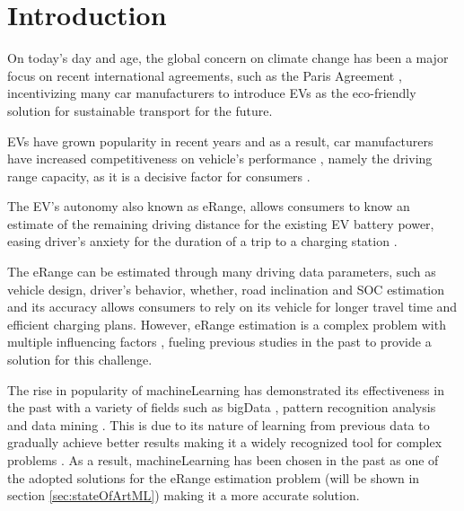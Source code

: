 \chapter{Introduction}
\label{cha:introduction}

On today's day and age, the global concern on climate
change has been a major focus on recent international agreements,
such as the Paris Agreement \citep{parisAgreement},
incentivizing many car manufacturers to introduce
\glspl{EV} as the eco-friendly
solution for sustainable transport for the future.

\glspl{EV} have grown popularity in
recent years and as a result, car manufacturers have
increased competitiveness on vehicle's performance
\citep{evCompetitiveness}, namely the driving range 
capacity, as it is a decisive factor for
consumers \citep{EGBUE2012717}.

The \gls{EV}'s autonomy also known as \gls{eRange},
allows consumers to know an estimate of the
remaining driving distance for the existing \gls{EV}
battery power, easing driver's anxiety for the duration
of a trip to a charging station \citep{eRangeFactors, driverAnxiety}.

The \gls{eRange} can be estimated through many
driving data parameters,
such as vehicle design, driver's behavior, whether,
road inclination and \gls{SOC} estimation and its
accuracy allows consumers to rely
on its vehicle for longer travel time and efficient
charging plans. However, \gls{eRange} estimation
is a complex problem with multiple influencing
factors \citep{predictionOfeRange}, fueling previous
studies in the past to provide a solution for this challenge.

The rise in popularity of \gls{machineLearning}
\citep{machineLearningCaseStudy}
has demonstrated its effectiveness in the
past with a variety of fields such as \gls{bigData}
\citep{machineLearningBigData, machineLearningBigData2},
pattern recognition analysis and data mining
\citep{businessDataMining}.  
This is due to its nature of learning 
from previous data to gradually achieve
better results making it a widely 
recognized tool for complex problems 
\citep{mitchelllearning}.
As a result, \gls{machineLearning}
has been chosen in the past 
as one of the adopted solutions for 
the \gls{eRange} estimation problem 
(will be shown in section \ref{sec:stateOfArtML})
making it a more accurate solution.  

